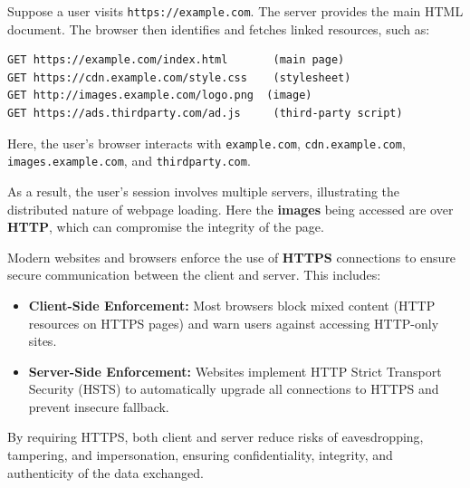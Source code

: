 \begin{Example}
Suppose a user visits \texttt{https://example.com}. The server provides the main HTML document. The browser then identifies and fetches linked resources, such as:
\begin{verbatim}
GET https://example.com/index.html       (main page)
GET https://cdn.example.com/style.css    (stylesheet)
GET http://images.example.com/logo.png  (image)
GET https://ads.thirdparty.com/ad.js     (third-party script)
\end{verbatim}
Here, the user's browser interacts with \texttt{example.com}, \texttt{cdn.example.com}, \texttt{images.example.com}, and \texttt{thirdparty.com}.

\noindent
As a result, the user's session involves multiple servers, illustrating the distributed nature of webpage loading.
Here the \textbf{images} being accessed are over \textbf{HTTP}, which can compromise the integrity of the page.
\end{Example}

\begin{theo}

    \label{theo:https_enforcement}
    Modern websites and browsers enforce the use of \textbf{HTTPS} connections to ensure secure communication between the client and server. This includes:
    \begin{itemize}
        \item \textbf{Client-Side Enforcement:}  
        Most browsers block mixed content (HTTP resources on HTTPS pages) and warn users against accessing HTTP-only sites.
        \item \textbf{Server-Side Enforcement:}  
        Websites implement HTTP Strict Transport Security (HSTS) to automatically upgrade all connections to HTTPS and prevent insecure fallback.
    \end{itemize}
    
    \noindent By requiring HTTPS, both client and server reduce risks of eavesdropping, tampering, and impersonation, ensuring confidentiality, integrity, and authenticity of the data exchanged.
\end{theo}
    

